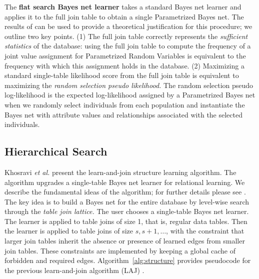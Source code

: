 \documentclass{article}
\begin{document}
The \textbf{flat search Bayes net learner} takes a standard Bayes net learner and applies it to the full join table to obtain a single Parametrized Bayes net. The results of \cite{Schulte2011} can be used to provide a theoretical justification for this procedure; we outline two key points. (1) The full join table correctly represents the {\em sufficient statistics} of the database: using the full join table to compute the frequency of a joint value assignment for Parametrized Random Variables is equivalent to the frequency with which this assignment holds in the database. (2) Maximizing a standard single-table likelihood score from the full join table is equivalent to maximizing the {\em random selection pseudo likelihood.} The random selection pseudo log-likelihood is the expected log-likelihood assigned by a Parametrized Bayes net when we randomly select individuals from each population and instantiate the Bayes net with attribute values and relationships associated with the selected individuals. 

\subsection{Hierarchical Search}
Khosravi {\em et al.} \cite{Schulte2012} present the learn-and-join  structure learning algorithm. 
The algorithm upgrades a single-table Bayes net learner for relational learning. 
We describe the fundamental ideas of the algorithm; for further details please see \cite{Schulte2012}. 
The key idea is to build a Bayes net for the entire database by level-wise search through the {\em table join lattice.} The user chooses a single-table Bayes net learner. The learner is applied to table joins of size 1, that is, regular data tables. Then the learner is applied to table joins of size $s,s+1,\ldots$, with the constraint that larger join tables inherit the absence or presence of learned edges from smaller join tables. These constraints are implemented by keeping a global cache of forbidden and required edges.  Algorithm~\ref{alg:structure} provides pseudocode for the previous learn-and-join algorithm (LAJ) \cite{Schulte2012c}. 
\end{document}
